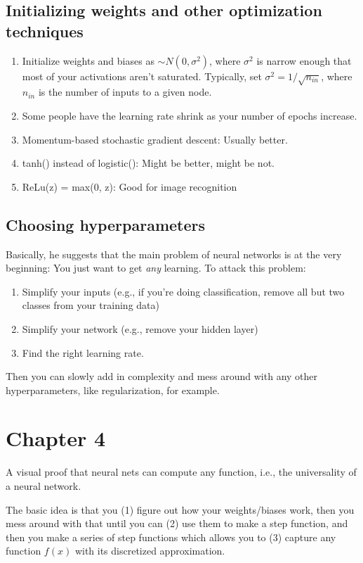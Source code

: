 \documentclass[12pt]{article}
\begin{document}
\subsection*{Initializing weights and other optimization techniques}

\begin{enumerate}
\item Initialize weights and biases as $\sim N(0, \sigma^2)$, where $\sigma^2$ is narrow enough that most of your activations aren't saturated. Typically, set $\sigma^2 = 1/\sqrt{n_{in}}$, where $n_{in}$ is the number of inputs to a given node.
\item Some people have the learning rate shrink as your number of epochs increase.
\item Momentum-based stochastic gradient descent: Usually better.
\item tanh() instead of logistic(): Might be better, might be not.
\item ReLu(z) = max(0, z): Good for image recognition
\end{enumerate}

\subsection*{Choosing hyperparameters}

Basically, he suggests that the main problem of neural networks is at the very beginning: You just want to get \textit{any} learning. To attack this problem:

\begin{enumerate}
\item Simplify your inputs (e.g., if you're doing classification, remove all but two classes from your training data)
\item Simplify your network (e.g., remove your hidden layer)
\item Find the right learning rate.
\end{enumerate}

Then you can slowly add in complexity and mess around with any other hyperparameters, like regularization, for example.

\section*{Chapter 4}

A visual proof that neural nets can compute any function, i.e., the universality of a neural network.

The basic idea is that you (1) figure out how your weights/biases work, then you mess around with that until you can (2) use them to make a step function, and then you make a series of step functions which allows you to (3) capture any function $f(x)$ with its discretized approximation.
\end{document}
